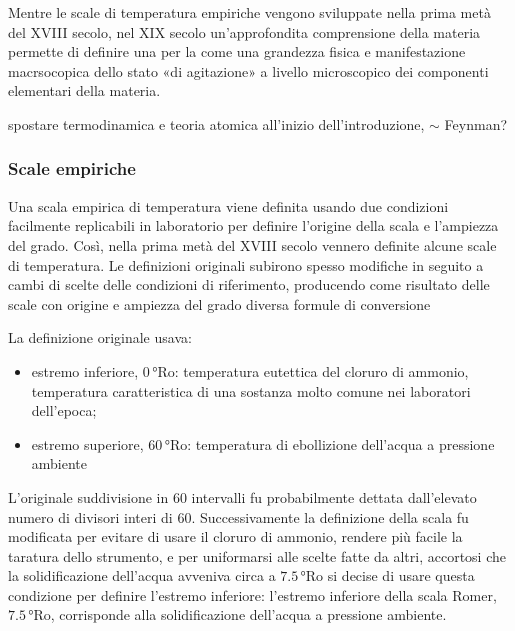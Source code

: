 \documentclass[letterpaper,10pt,italian]{jupyterBook}
\begin{document}
\sphinxAtStartPar
{} Mentre le scale di temperatura empiriche vengono sviluppate nella prima metà del XVIII secolo, nel XIX secolo un’approfondita comprensione della materia permette di definire una  per la  come una grandezza fisica e manifestazione macrsocopica dello stato «di agitazione» a livello microscopico dei componenti elementari della materia.

\sphinxAtStartPar
 spostare termodinamica e teoria atomica all’inizio dell’introduzione, \(\sim\) Feynman?


\subsubsection{Scale empiriche}
\label{\detokenize{ch/thermodynamics/foundation-experiments:scale-empiriche}}
\sphinxAtStartPar
Una scala empirica di temperatura viene definita usando due condizioni facilmente replicabili in laboratorio per definire l’origine della scala e l’ampiezza del grado. Così, nella prima metà del XVIII secolo vennero definite alcune scale di temperatura. Le definizioni originali subirono spesso modifiche in seguito a cambi di scelte delle condizioni di riferimento, producendo come risultato delle scale con origine e ampiezza del grado diversa formule di conversione



\sphinxAtStartPar
{} La definizione originale usava:
\begin{itemize}
\item {} 
\sphinxAtStartPar
estremo inferiore,  \(0 \, \text{°Ro}\): temperatura eutettica del cloruro di ammonio, temperatura caratteristica di una sostanza molto comune nei laboratori dell’epoca;

\item {} 
\sphinxAtStartPar
estremo superiore, \(60 \, \text{°Ro}\): temperatura di ebollizione dell’acqua a pressione ambiente

\end{itemize}

\sphinxAtStartPar
L’originale suddivisione in \(60\) intervalli fu probabilmente dettata dall’elevato numero di divisori interi di \(60\).
Successivamente la definizione della scala fu modificata per evitare di usare il cloruro di ammonio, rendere più facile la taratura dello strumento, e per uniformarsi alle scelte fatte da altri, accortosi che la solidificazione dell’acqua avveniva circa a \(7.5 \, \text{°Ro}\) si decise di usare questa condizione per definire l’estremo inferiore: l’estremo inferiore della scala Romer, \(7.5 \, \text{°Ro}\), corrisponde alla solidificazione dell’acqua a pressione ambiente.
\end{document}
